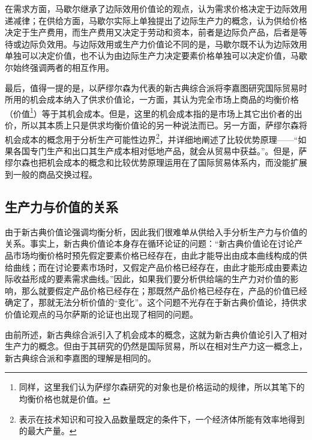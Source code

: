  在需求方面，马歇尔继承了边际效用价值论的观点，认为需求价格决定于边际效用递减律；在供给方面，马歇尔实际上单独提出了边际生产力的概念\cite[8223]{macmillanpublishersltdNewPalgraveDictionary2018}，认为供给价格决定于生产费用，而生产费用又决定于劳动和资本，前者是边际负产品，后者是等待或边际负效用\cite[391]{YanZhiJieCongBianJiGeMingDaoKaiEnSiGeMing2022}。与边际效用或生产力价值论不同的是，马歇尔既不认为边际效用单独可以决定价值，也不认为由边际生产力决定要素价格单独可以决定价值，马歇尔始终强调两者的相互作用。

最后，值得一提的是，以萨缪尔森为代表的新古典综合派将李嘉图研究国际贸易时所用的机会成本纳入了供求价值论，一方面，其认为完全市场上商品的均衡价格（价值\footnote{同样，这里我们认为萨缪尔森研究的对象也是价格运动的规律，所以其笔下的均衡价格也就是价值。}）等于其机会成本\cite[228]{BaoLuo*SaMouErSenJingJiXueDiShiJiuBan2012}。但是，这里的机会成本指的是市场上其它出价者的出价\cite[228-229]{BaoLuo*SaMouErSenJingJiXueDiShiJiuBan2012}，所以其本质上只是供求均衡价值论的另一种说法而已。另一方面，萨缪尔森将机会成本的概念用于分析生产可能性边界\footnote{表示在技术知识和可投入品数量既定的条件下，一个经济体所能有效率地得到的最大产量\cite[22]{BaoLuo*SaMouErSenJingJiXueDiShiJiuBan2012}。}，并详细地阐述了比较优势原理——“如果各国专门生产和出口其生产成本相对低地产品，就会从贸易中获益。”\cite[581]{BaoLuo*SaMouErSenJingJiXueDiShiJiuBan2012}。但是，萨缪尔森也把机会成本的概念和比较优势原理运用在了国际贸易体系内，而没能扩展到一般的商品交换过程。

 \subsection{生产力与价值的关系}

 由于新古典价值论强调均衡分析，因此我们很难单从供给入手分析生产力与价值的关系。事实上，新古典价值论本身存在循环论证的问题：“新古典价值论在讨论产品市场均衡价格时预先假定要素价格已经存在，由此才能导出由成本曲线构成的供给曲线；而在讨论要素市场时，又假定产品价格已经存在，由此才能形成由要素边际收益形成的要素需求曲线。”\cite[186]{CaiJiMingCongGuDianZhengZhiJingJiXueDaoZhongGuoTeSeSheHuiZhuYiZhengZhiJingJiXueJiYuZhongGuoShiJiaoDeZhengZhiJingJiXueYanBianShangCe2023}因此，如果我们要分析供给端的生产力对价值的影响，那么就要假定产品价格已经存在；那既然产品价格已经存在，产品的价值已经确定了，那就无法分析价值的“变化”。这个问题不光存在于新古典价值论，持供求价值论观点的马尔萨斯的论证也出现了相同的问题。

由前所述，新古典综合派引入了机会成本的概念，这就为新古典价值论引入了相对生产力的概念。但由于其研究的仍然是国际贸易，所以在相对生产力这一概念上，新古典综合派和李嘉图的理解是相同的。